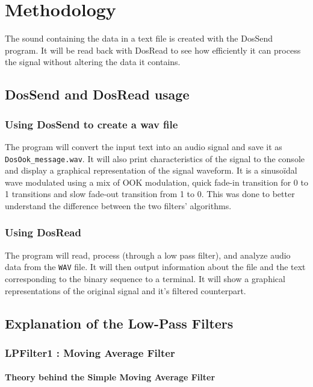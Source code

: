 \chapter{Methodology}

The sound containing the data in a text file is created with the DosSend program. It will be read back with DosRead to see how efficiently it can process the signal without altering the data it contains.

\section{DosSend and DosRead usage}

\subsection{Using DosSend to create a wav file}

The program will convert the input text into an audio signal and save it as \texttt{DosOok\_message.wav}. It will also print characteristics of the signal to the console and display a graphical representation of the signal waveform. It is a sinusoïdal wave modulated using a mix of OOK modulation, quick fade-in transition for 0 to 1 transitions and slow fade-out transition from 1 to 0. This was done to better understand the difference between the two filters' algorithms.

\subsection{Using DosRead}

The program will read, process (through a low pass filter), and analyze audio data from the \texttt{WAV} file. It will then output information about the file and the text corresponding to the binary sequence to a terminal. It will show a graphical representations of the original signal and it's filtered counterpart.

\section{Explanation of the Low-Pass Filters}

\subsection{LPFilter1 : Moving Average Filter}

\subsubsection{Theory behind the Simple Moving Average Filter}

